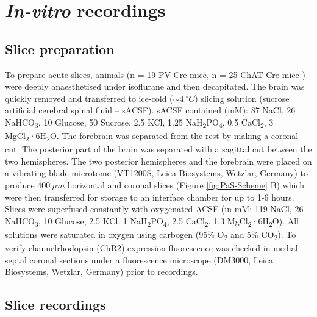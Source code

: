 \documentclass[
  12pt,
  a4paper,
  openany]{book}
\begin{document}
\hypertarget{in-vitro-recordings}{%
\section{\texorpdfstring{\emph{In-vitro} recordings}{In-vitro recordings}}\label{in-vitro-recordings}}

\hypertarget{slice-preparation}{%
\subsection{Slice preparation}\label{slice-preparation}}

To prepare acute slices, animals (n = 19 PV-Cre mice, n = 25 ChAT-Cre mice ) were deeply anaesthetised under isoflurane and then decapitated. The brain was quickly removed and transferred to ice-cold (\(\sim 4\ ^{\circ}C\)) slicing solution (sucrose artificial cerebral spinal fluid -- sACSF). sACSF contained (mM): 87 NaCl, 26 NaHCO\textsubscript{3}, 10 Glucose, 50 Sucrose, 2.5 KCl, 1.25 NaH\textsubscript{2}PO\textsubscript{4}, 0.5 CaCl\textsubscript{2}, 3 MgCl\textsubscript{2}·6H\textsubscript{2}O. The forebrain was separated from the rest by making a coronal cut. The posterior part of the brain was separated with a sagittal cut between the two hemispheres. The two posterior hemispheres and the forebrain were placed on a vibrating blade microtome (VT1200S, Leica Biosystems, Wetzlar, Germany) to produce \(400\ \mu m\) horizontal and coronal slices (Figure \ref{fig:PaS-Scheme} B) which were then transferred for storage to an interface chamber for up to 1-6 hours. Slices were superfused constantly with oxygenated ACSF (in mM: 119 NaCl, 26 NaHCO\textsubscript{3}, 10 Glucose, 2.5 KCl, 1 NaH\textsubscript{2}PO\textsubscript{4}, 2.5 CaCl\textsubscript{2}, 1.3 MgCl\textsubscript{2}·6H\textsubscript{2}O). All solutions were saturated in oxygen using carbogen (95\% O\textsubscript{2} and 5\% CO\textsubscript{2}). To verify channelrhodopsin (ChR2) expression fluorescence was checked in medial septal coronal sections under a fluorescence microscope (DM3000, Leica Biosystems, Wetzlar, Germany) prior to recordings.

\hypertarget{slice-recordings}{%
\subsection{Slice recordings}\label{slice-recordings}}
\end{document}
